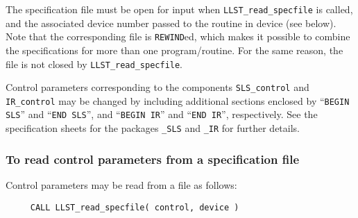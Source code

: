 \documentclass{galahad}
\newcommand{\packagename}{LLST}
\begin{document}
The specification file must be open for 
input when {\tt \packagename\_read\_specfile}
is called, and the associated device number 
passed to the routine in device (see below). 
Note that the corresponding 
file is {\tt REWIND}ed, which makes it possible to combine the specifications 
for more than one program/routine.  For the same reason, the file is not
closed by {\tt \packagename\_read\_specfile}.

Control parameters corresponding to the components 
{\tt SLS\_control}
and
{\tt IR\_control} may be changed by including additional sections enclosed by
``{\tt BEGIN SLS}'' and 
``{\tt END SLS}'', and
``{\tt BEGIN IR}'' and 
``{\tt END IR}'', respectively. 
See the specification sheets for the packages 
{\tt \libraryname\_SLS} 
and
{\tt \libraryname\_IR}
for further details.

\subsubsection{To read control parameters from a specification file}
\label{readspec}

Control parameters may be read from a file as follows:
\hskip0.5in 
\def\baselinestretch{0.8} {\tt \begin{verbatim}
     CALL LLST_read_specfile( control, device )
\end{verbatim}}
\def\baselinestretch{1.0}
\end{document}
